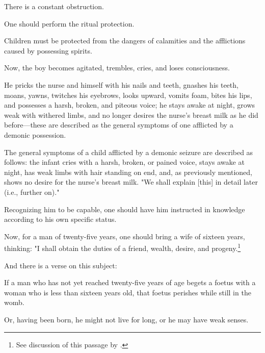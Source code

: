 \begin{translation}
\begin{tt}
There is a constant obstruction.

One should perform the ritual protection.

Children must be protected from the dangers of calamities and the
afflictions caused by possessing spirits.

\item[51]

Now, the boy becomes agitated, trembles, cries, and loses
consciousness.

He pricks the nurse and himself with his nails and teeth, gnashes his
teeth, moans, yawns, twitches his eyebrows, looks upward, vomits foam,
bites his lips, and possesses a harsh, broken, and piteous voice; he
stays awake at night, grows weak with withered limbs, and no longer
desires the nurse's breast milk as he did before---these
are described as the general symptoms of one afflicted by a demonic
possession.

The general symptoms of a child afflicted by a demonic seizure are
described as follows: the infant cries with a harsh, broken, or pained
voice, stays awake at night, has weak limbs with hair standing on end,
and, as previously mentioned, shows no desire for the
nurse's breast milk. "We shall explain [this] in
detail later (i.e., further on)."

\item[52]

Recognizing him to be capable, one should have him instructed in
knowledge according to his own specific status.

\item[53]

Now, for a man of twenty-five years, one should bring a wife of sixteen
years, thinking: "I shall obtain the duties of a friend, wealth, desire,
and progeny.\footnote{See discussion of this passage by \citet{wuja-2025e}.}

\item[54]

And there is a verse on this subject:
\begin{sloka}
    If a man who has not yet reached twenty-five years of age begets a
foetus with a woman who is less than sixteen years old, that foetus
perishes while still in the womb.
\end{sloka}

\item[55]

Or, having been born, he might not live for long, or he may have weak
senses.


\end{tt}
\end{translation}
